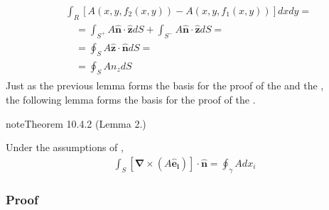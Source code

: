 \documentclass[letterpaper,10pt,english]{jupyterBook}
\begin{document}
\begin{equation*}
\begin{split}
\begin{aligned}
 & \int_R [A(x,y,f_2(x,y)) - A(x,y,f_1(x,y))] dx dy =   \\
 & \quad = \int_{S^+} A \mathbf{\hat{n}} \cdot\mathbf{\hat{z}} dS + \int_{S^-} A \mathbf{\hat{n}} \cdot\mathbf{\hat{z}} dS = \\
 & \quad =  \oint_S A \mathbf{\hat{z}} \cdot \mathbf{\hat{n}} dS = \\
 & \quad =  \oint_S A n_z dS
\end{aligned}
\end{split}
\end{equation*}
\sphinxAtStartPar
Just as the previous lemma forms the basis for the proof of the {\hyperref[\detokenize{ch/tensor-algebra-calculus/calculus-euclidean:tensor-calculus-integrals-theorems-gradient}]{}} and the {\hyperref[\detokenize{ch/tensor-algebra-calculus/calculus-euclidean:tensor-calculus-integrals-theorems-divergence}]{}},\\
the following lemma forms the basis for the proof of the {\hyperref[\detokenize{ch/tensor-algebra-calculus/calculus-euclidean:tensor-calculus-integrals-theorems-curl}]{}}.
\label{ch/tensor-algebra-calculus/calculus-euclidean:lemma-2}
\begin{sphinxadmonition}{note}{Theorem 10.4.2 (Lemma 2.)}



\sphinxAtStartPar
Under the assumptions of {\hyperref[\detokenize{ch/multivariable/intro:multivariable-calculus-green-lemma}]{}},
\begin{equation*}
\begin{split}
  \int_S [\mathbf{\nabla} \times (A \mathbf{\hat{e}_i})] \cdot \mathbf{\hat{n}} = \oint_{\gamma} A dx_i
\end{split}
\end{equation*}\end{sphinxadmonition}
\subsubsection*{Proof}
\end{document}
